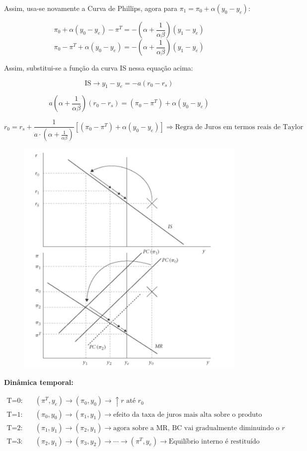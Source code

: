 \documentclass[a4paper,12pt]{article}[abntex2]
\begin{document}
Assim, usa-se novamente a Curva de Phillips, agora para \( \pi_1 = \pi_0 + \alpha (y_0 - y_e) \):

\[
\pi_0 + \alpha (y_0 - y_e) - \pi^T = -\left( \alpha + \frac{1}{\alpha \beta} \right) (y_1 - y_e)
\]
\[
\pi_0 - \pi^T + \alpha (y_0 - y_e) = -\left( \alpha + \frac{1}{\alpha \beta} \right) (y_1 - y_e)
\]

Assim, substitui-se a função da curva IS nessa equação acima:

\[
\text{IS} \rightarrow y_1 - y_e = -a (r_0 - r_s)
\]

\[
a \left( \alpha + \frac{1}{\alpha \beta} \right) (r_0 - r_s) = (\pi_0 - \pi^T) + \alpha (y_0 - y_e)
\]

\[
r_0 = r_s + \frac{1}{a \cdot \left( \alpha + \frac{1}{\alpha \beta} \right)} \left[ (\pi_0 - \pi^T) + \alpha (y_0 - y_e) \right]
\Rightarrow \text{Regra de Juros em termos reais de Taylor}
\]

\begin{figure}[H]
    \centering
    \includegraphics[width=0.7\linewidth]{Imagens/a16i2.png}
\end{figure}

\textbf{Dinâmica temporal:}

\begin{align*}
\text{T=0:} & \quad (\pi^T, y_e) \rightarrow (\pi_0, y_0) \rightarrow \uparrow r \text{ até } r_0 \\
\text{T=1:} & \quad (\pi_0, y_0) \rightarrow (\pi_1, y_1) \rightarrow \text{efeito da taxa de juros mais alta sobre o produto} \\
\text{T=2:} & \quad (\pi_1, y_1) \rightarrow (\pi_2, y_1) \rightarrow \text{agora sobre a MR, BC vai gradualmente diminuindo o } r \\
\text{T=3:} & \quad (\pi_2, y_1) \rightarrow (\pi_3, y_2) \rightarrow \cdots \rightarrow (\pi^T, y_e) \rightarrow \text{Equilíbrio interno é restituído}
\end{align*}
\end{document}
